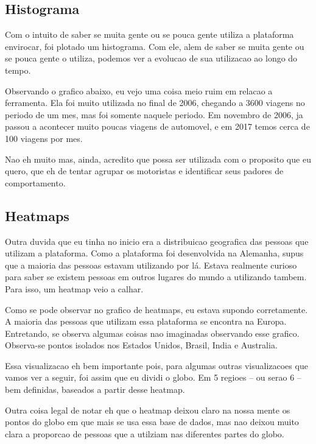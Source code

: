 \documentclass[10pt, conference]{IEEEtran}
\begin{document}
\subsection{Histograma}
Com o intuito de saber se muita gente ou se pouca gente utiliza a plataforma envirocar,
foi plotado um histograma. Com ele, alem de saber se muita gente ou se pouca gente o utiliza,
podemos ver a evolucao de sua utilizacao ao longo do tempo.

Observando o grafico abaixo, eu vejo uma coisa meio ruim em relacao a ferramenta. Ela foi 
muito utilizada no final de 2006, chegando a 3600 viagens no periodo de um mes, mas foi
somente naquele periodo. Em novembro de 2006, ja passou a acontecer muito poucas viagens 
de automovel, e em 2017 temos cerca de 100 viagens por mes. 

Nao eh muito mas, ainda, acredito que possa ser utilizada com o proposito que eu quero, que eh
de tentar agrupar os motoristas e identificar seus padores de comportamento.



\subsection{Heatmaps}

Outra duvida que eu tinha no inicio era a distribuicao geografica das pessoas que utilizam a plataforma. 
Como a plataforma foi desenvolvida na Alemanha, supus que a maioria das pessoas estavam utilizando por lá. 
Estava realmente curioso para saber se existem pessoas em outros lugares do mundo a utilizando tambem. 
Para isso, um heatmap veio a calhar. 

Como se pode observar no grafico de heatmaps, eu estava supondo corretamente. A maioria das pessoas
que utilizam essa plataforma se encontra na Europa. Entretando, se observa algumas coisas nao imaginadas
observando esse grafico. Observa-se pontos isolados nos Estados Unidos, Brasil, India e Australia.

Essa visualizacao eh bem importante pois, para algumas outras visualizacoes que vamos ver a seguir, 
foi assim que eu dividi o globo. Em 5 regioes -- ou serao 6 -- bem definidas, baseados a partir desse
heatmap.

Outra coisa legal de notar eh que o heatmap deixou claro na nossa mente os pontos do globo em que 
mais se usa essa base de dados, mas nao deixou muito clara a proporcao de pessoas que a utilziam
nas diferentes partes do globo.
\end{document}
